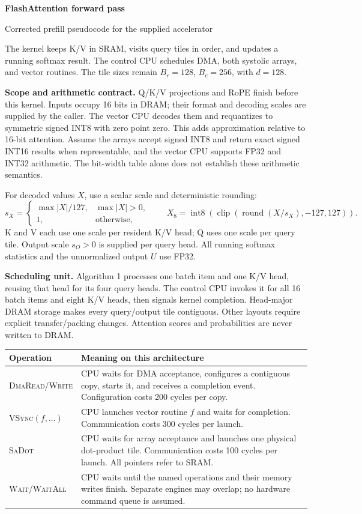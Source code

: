 \documentclass[11pt]{article}
\newcommand{\I}[1]{\operatorname{int#1}}
\newcommand{\clip}{\operatorname{clip}}
\newcommand{\round}{\operatorname{round}}
\newcommand{\VSync}{\textsc{VSync}}
\begin{document}
{\Large\bfseries\color{ink}FlashAttention forward pass}\par
{\large Corrected prefill pseudocode for the supplied accelerator}

The kernel keeps K/V in SRAM, visits query tiles in order, and updates a running
softmax result. The control CPU schedules DMA, both systolic arrays, and vector
routines. The tile sizes remain $B_r=128$, $B_c=256$, with $d=128$.

\textbf{Scope and arithmetic contract.}
Q/K/V projections and RoPE finish before this kernel. Inputs occupy 16 bits in
DRAM; their format and decoding scales are supplied by the caller. The vector
CPU decodes them and requantizes to symmetric signed INT8 with zero point zero.
This adds approximation relative to 16-bit attention. Assume the arrays accept
signed INT8 and return exact signed INT16 results when representable, and the
vector CPU supports FP32 and INT32 arithmetic. The bit-width table alone does
not establish these arithmetic semantics.

For decoded values $X$, use a scalar scale and deterministic rounding:
\[
s_X=\begin{cases}\max|X|/127,&\max|X|>0,\\1,&\text{otherwise},\end{cases}
\qquad X_8=\I{8}\!\left(\clip(\round(X/s_X),-127,127)\right).
\]
K and V each use one scale per resident K/V head; Q uses one scale per query
tile. Output scale $s_O>0$ is supplied per query head. All running softmax
statistics and the unnormalized output $U$ use FP32.

\textbf{Scheduling unit.}
Algorithm 1 processes one batch item and one K/V head, reusing that head for its
four query heads. The control CPU invokes it for all 16 batch items and eight
K/V heads, then signals kernel completion. Head-major DRAM storage makes every
query/output tile contiguous. Other layouts require explicit transfer/packing
changes. Attention scores and probabilities are never written to DRAM.

\begin{tabularx}{\linewidth}{@{}p{3.25cm}X@{}}
\toprule
Operation & Meaning on this architecture \\
\midrule
\textsc{DmaRead/Write} & CPU waits for DMA acceptance, configures a contiguous copy,
starts it, and receives a completion event. Configuration costs 200 cycles per copy. \\
\VSync$(f,\ldots)$ & CPU launches vector routine $f$ and waits for completion.
Communication costs 300 cycles per launch. \\
\textsc{SaDot} & CPU waits for array acceptance and launches one physical dot-product
tile. Communication costs 100 cycles per launch. All pointers refer to SRAM. \\
\textsc{Wait/WaitAll} & CPU waits until the named operations and their memory writes
finish. Separate engines may overlap; no hardware command queue is assumed. \\
\bottomrule
\end{tabularx}
\end{document}
